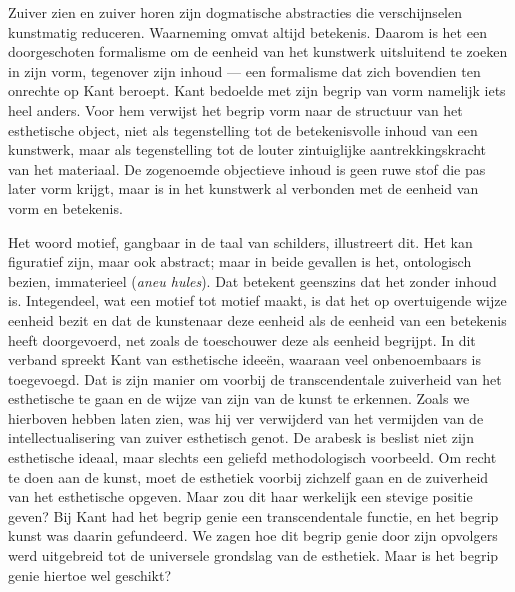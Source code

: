 Zuiver zien en zuiver horen zijn dogmatische abstracties die verschijnselen kunstmatig reduceren. Waarneming omvat altijd betekenis. Daarom is het een doorgeschoten formalisme om de eenheid van het kunstwerk uitsluitend te zoeken in zijn vorm, tegenover zijn inhoud — een formalisme dat zich bovendien ten onrechte op Kant beroept.
Kant bedoelde met zijn begrip van vorm namelijk iets heel anders. Voor hem verwijst het begrip vorm naar de structuur van het esthetische object, niet als tegenstelling tot de betekenisvolle inhoud van een kunstwerk, maar als tegenstelling tot de louter zintuiglijke aantrekkingskracht van het materiaal. De zogenoemde objectieve inhoud is geen ruwe stof die pas later vorm krijgt, maar is in het kunstwerk al verbonden met de eenheid van vorm en betekenis.

Het woord motief, gangbaar in de taal van schilders, illustreert dit. Het kan figuratief zijn, maar ook abstract; maar in beide gevallen is het, ontologisch bezien, immaterieel (\textit{aneu hules}). Dat betekent geenszins dat het zonder inhoud is. Integendeel, wat een motief tot motief maakt, is dat het op overtuigende wijze eenheid bezit en dat de kunstenaar deze eenheid als de eenheid van een betekenis heeft doorgevoerd, net zoals de toeschouwer deze als eenheid begrijpt. In dit verband spreekt Kant van esthetische ideeën, waaraan veel onbenoembaars is toegevoegd. Dat is zijn manier om voorbij de transcendentale zuiverheid van het esthetische te gaan en de wijze van zijn van de kunst te erkennen. Zoals we hierboven hebben laten zien, was hij ver verwijderd van het vermijden van de intellectualisering van zuiver esthetisch genot. De arabesk is beslist niet zijn esthetische ideaal, maar slechts een geliefd methodologisch voorbeeld. Om recht te doen aan de kunst, moet de esthetiek voorbij zichzelf gaan en de zuiverheid van het esthetische opgeven. Maar zou dit haar werkelijk een stevige positie geven? Bij Kant had het begrip genie een transcendentale functie, en het begrip kunst was daarin gefundeerd. We zagen hoe dit begrip genie door zijn opvolgers werd uitgebreid tot de universele grondslag van de esthetiek. Maar is het begrip genie hiertoe wel geschikt?

